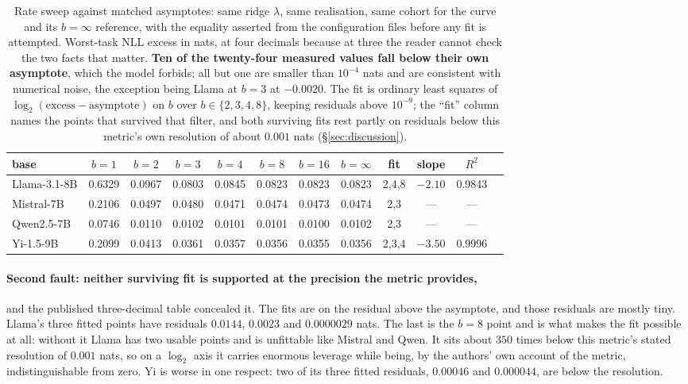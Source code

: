\begin{table}[t]
\centering
\small
\caption{Rate sweep against matched asymptotes: same ridge $\lambda$, same
realisation, same cohort for the curve and its $b = \infty$ reference, with
the equality asserted from the configuration files before any fit is
attempted. Worst-task NLL excess in nats, at four decimals because at three
the reader cannot check the two facts that matter. \textbf{Ten of the
twenty-four measured values fall below their own asymptote}, which the model
forbids; all but one are smaller than $10^{-4}$ nats and are consistent with
numerical noise, the exception being Llama at $b=3$ at $-0.0020$. The fit is
ordinary least squares of $\log_2(\text{excess} - \text{asymptote})$ on $b$
over $b \in \{2,3,4,8\}$, keeping residuals above $10^{-9}$; the ``fit''
column names the points that survived that filter, and both surviving fits
rest partly on residuals below this metric's own resolution of about
$0.001$ nats (\S\ref{sec:discussion}).}
\label{tab:w3}
\begin{tabular}{lccccccccccc}
\toprule
base & $b{=}1$ & $b{=}2$ & $b{=}3$ & $b{=}4$ & $b{=}8$ & $b{=}16$ &
$b{=}\infty$ & fit & slope & $R^2$ \\
\midrule
Llama-3.1-8B & 0.6329 & 0.0967 & 0.0803 & 0.0845 & 0.0823 & 0.0823 & 0.0823 & 2,4,8 & $-2.10$ & 0.9843 \\
Mistral-7B & 0.2106 & 0.0497 & 0.0480 & 0.0471 & 0.0474 & 0.0473 & 0.0474 & 2,3 & --- & --- \\
Qwen2.5-7B & 0.0746 & 0.0110 & 0.0102 & 0.0101 & 0.0101 & 0.0100 & 0.0102 & 2,3 & --- & --- \\
Yi-1.5-9B & 0.2099 & 0.0413 & 0.0361 & 0.0357 & 0.0356 & 0.0355 & 0.0356 & 2,3,4 & $-3.50$ & 0.9996 \\
\bottomrule
\end{tabular}
\end{table}

\paragraph{Second fault: neither surviving fit is supported at the
precision the metric provides,} and the published three-decimal table
concealed it. The fits are on the residual above the asymptote, and those
residuals are mostly tiny. Llama's three fitted points have residuals
$0.0144$, $0.0023$ and $0.0000029$ nats. The last is the $b = 8$ point and
is what makes the fit possible at all: without it Llama has two usable
points and is unfittable like Mistral and Qwen. It sits about $350$ times
below this metric's stated resolution of $0.001$ nats, so on a $\log_2$
axis it carries enormous leverage while being, by the authors' own account of the
metric, indistinguishable from zero. Yi is worse in one respect: two of its
three fitted residuals, $0.00046$ and $0.000044$, are below the resolution.

